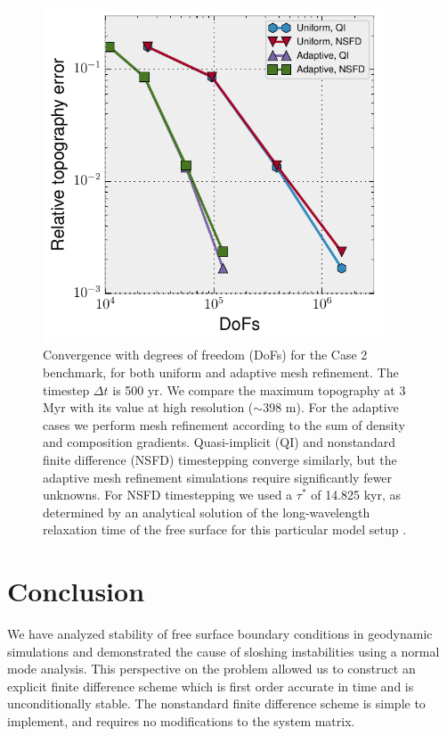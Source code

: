 \documentclass[preprint,12pt,authoryear]{elsarticle}
\begin{document}
\begin{figure}
\includegraphics[width=0.9\textwidth]{figures/amr.pdf}
\caption[Convergence with degrees of freedom (DoFs) for the \citet{crameri2012comparison} Case 2 benchmark, for both uniform and adaptive mesh refinement.]{Convergence with degrees of freedom (DoFs) for the \citet{crameri2012comparison} Case 2 benchmark, for both uniform and adaptive mesh refinement. The timestep $\Delta t$ is 500 yr. We compare the maximum topography at 3 Myr with its value at high resolution ($\sim$398 m). For the adaptive cases we perform mesh refinement according to the sum of density and composition gradients. Quasi-implicit (QI) and nonstandard finite difference (NSFD) timestepping converge similarly, but the adaptive mesh refinement simulations require significantly fewer unknowns. For NSFD timestepping we used a $\tau^*$ of 14.825 kyr, as determined by an analytical solution of the long-wavelength relaxation time of the free surface for this particular model setup \citep{crameri2012comparison}.}
\label{fig:amr}
\end{figure}

\section{Conclusion}
We have analyzed stability of free surface boundary conditions in geodynamic simulations and 
demonstrated the cause of sloshing instabilities using a normal mode analysis.
This perspective on the problem allowed us to construct an explicit finite difference 
scheme which is first order accurate in time and is unconditionally stable.
The nonstandard finite difference scheme is simple to implement, and 
requires no modifications to the system matrix.
\end{document}
